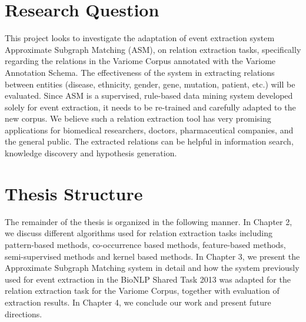 \section{Research Question}\label{section1.3} %
This project looks to investigate the adaptation of event extraction system Approximate Subgraph Matching (ASM)\cite{liu2013approximate},  on relation extraction tasks, specifically regarding the relations in the Variome Corpus annotated with the Variome Annotation Schema\cite{verspoor2013annotating}. The effectiveness of the system in extracting relations between entities (disease, ethnicity, gender, gene, mutation, patient, etc.) will be evaluated. Since ASM is a supervised, rule-based data mining system developed solely for event extraction, it needs to be re-trained and carefully adapted to the new corpus. We believe such a relation extraction tool has very promising applications for biomedical researchers, doctors, pharmaceutical companies, and the general public. The extracted relations can be helpful in information search, knowledge discovery and hypothesis generation. 
\section{Thesis Structure}
The remainder of the thesis is organized in the following manner. In Chapter 2, we discuss different algorithms used for relation extraction tasks including pattern-based methods, co-occurrence based methods, feature-based methods, semi-supervised methods and kernel based methods. In Chapter 3, we present the Approximate Subgraph Matching system in detail and how the system previously used for event extraction in the BioNLP Shared Task 2013 was adapted for the relation extraction task for the Variome Corpus, together with evaluation of extraction results. In Chapter 4, we conclude our work and present future directions.

